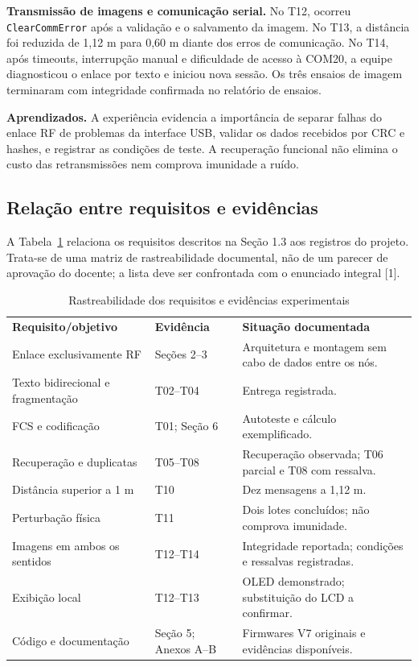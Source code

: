 \textbf{Transmissão de imagens e comunicação serial.} No T12, ocorreu \texttt{ClearCommError} após a validação e o salvamento da imagem. No T13, a distância foi reduzida de 1,12 m para 0,60 m diante dos erros de comunicação. No T14, após timeouts, interrupção manual e dificuldade de acesso à COM20, a equipe diagnosticou o enlace por texto e iniciou nova sessão. Os três ensaios de imagem terminaram com integridade confirmada no relatório de ensaios.

\textbf{Aprendizados.} A experiência evidencia a importância de separar falhas do enlace RF de problemas da interface USB, validar os dados recebidos por CRC e hashes, e registrar as condições de teste. A recuperação funcional não elimina o custo das retransmissões nem comprova imunidade a ruído.

\subsection{Relação entre requisitos e evidências}
A Tabela~\ref{tab:requisitos} relaciona os requisitos descritos na Seção 1.3 aos registros do projeto. Trata-se de uma matriz de rastreabilidade documental, não de um parecer de aprovação do docente; a lista deve ser confrontada com o enunciado integral [1].
\begin{table}[H]\centering\small
\caption{Rastreabilidade dos requisitos e evidências experimentais}\label{tab:requisitos}
\begin{tabularx}{\linewidth}{p{.30\linewidth}p{.22\linewidth}X}
\rowcolor{tcdtablehead}\textbf{Requisito/objetivo} & \textbf{Evidência} & \textbf{Situação documentada}\\
Enlace exclusivamente RF & Seções 2--3 & Arquitetura e montagem sem cabo de dados entre os nós.\\
Texto bidirecional e fragmentação & T02--T04 & Entrega registrada.\\
FCS e codificação & T01; Seção 6 & Autoteste e cálculo exemplificado.\\
Recuperação e duplicatas & T05--T08 & Recuperação observada; T06 parcial e T08 com ressalva.\\
Distância superior a 1 m & T10 & Dez mensagens a 1,12 m.\\
Perturbação física & T11 & Dois lotes concluídos; não comprova imunidade.\\
Imagens em ambos os sentidos & T12--T14 & Integridade reportada; condições e ressalvas registradas.\\
Exibição local & T12--T13 & OLED demonstrado; substituição do LCD a confirmar.\\
Código e documentação & Seção 5; Anexos A--B & Firmwares V7 originais e evidências disponíveis.\\
\bottomrule\end{tabularx}\end{table}
